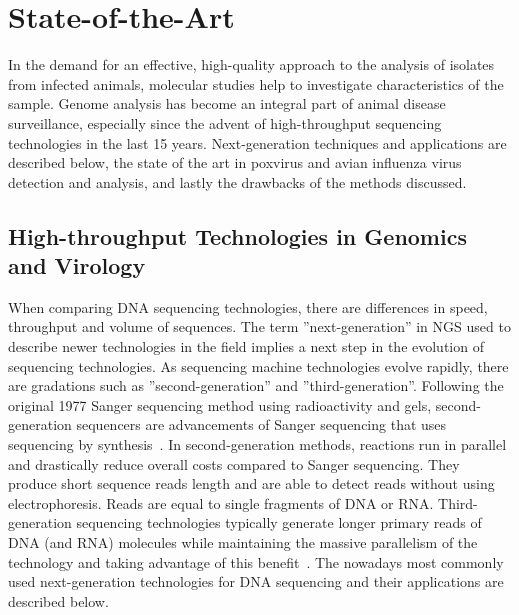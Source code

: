 \chapter{State-of-the-Art}\label{chap:state-art}
In the demand for an effective, high-quality approach to the analysis of isolates from infected animals, molecular studies help to investigate characteristics of the sample. Genome analysis has become an integral part of animal disease surveillance, especially since the advent of high-throughput sequencing technologies in the last 15 years. Next-generation techniques and applications are described below, the state of the art in poxvirus and avian influenza virus detection and analysis, and lastly the drawbacks of the methods discussed.

\section{High-throughput Technologies in Genomics and Virology}
When comparing DNA sequencing technologies, there are differences in speed, throughput and volume of sequences. The term ''next-generation'' in NGS used to describe newer technologies in the field implies a next step in the evolution of sequencing technologies. As sequencing machine technologies evolve rapidly, there are gradations such as ''second-generation'' and ''third-generation''. Following the original 1977 Sanger sequencing method using radioactivity and gels, second-generation sequencers are advancements of Sanger sequencing that uses sequencing by synthesis~\cite{mardis2008next}. In second-generation methods, reactions run in parallel and drastically reduce overall costs compared to Sanger sequencing. They produce short sequence reads length and are able to detect reads without using electrophoresis. Reads are equal to single fragments of DNA or RNA.
Third-generation sequencing technologies typically generate longer primary reads of DNA (and RNA) molecules while maintaining the massive parallelism of the technology and taking advantage of this benefit~\cite{slatko2018overview}. The nowadays most commonly used next-generation technologies for DNA sequencing and their applications are described below.

